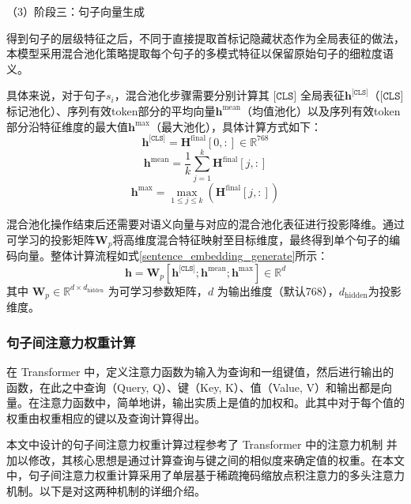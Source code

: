 （3）阶段三：句子向量生成

得到句子的层级特征之后，不同于直接提取首标记隐藏状态作为全局表征的做法，本模型采用混合池化策略提取每个句子的多模式特征以保留原始句子的细粒度语义。

具体来说，对于句子$s_i$，混合池化步骤需要分别计算其 $\texttt{[CLS]}$ 全局表征$\textbf{h}^\texttt{[CLS]}$（$\texttt{[CLS]}$ 标记池化）、序列有效token部分的平均向量$\textbf{h}^\text{mean}$（均值池化）以及序列有效token部分沿特征维度的最大值$\textbf{h}^\text{max}$（最大池化），具体计算方式如下：
\begin{equation}
    \textbf{h}^\texttt{[CLS]} = \textbf{H}^{\text{final}}[0, :] \in \mathbb{R}^{768}
\end{equation}
\begin{equation}
    \textbf{h}^{\text{mean}} = \frac{1}{k} \sum_{j=1}^{k} \textbf{H}^{\text{final}}[j, :]
\end{equation}
\begin{equation}
    \textbf{h}^{\text{max}} = \max_{1 \leq j \leq k} (\textbf{H}^{\text{final}}[j, :])
\end{equation}

混合池化操作结束后还需要对语义向量与对应的混合池化表征进行投影降维。通过可学习的投影矩阵$\textbf{W}_p$将高维度混合特征映射至目标维度，最终得到单个句子的编码向量。整体计算流程如式\ref{sentence_embedding_generate}所示：
\begin{equation}\label{sentence_embedding_generate}
    \textbf{h} = \textbf{W}_p[\textbf{h}^\texttt{[CLS]}; \textbf{h}^{\text{mean}}; \textbf{h}^{\text{max}}] \in \mathbb{R}^d
\end{equation}
其中 $\textbf{W}_p \in \mathbb{R}^{d \times d_\text{hidden}}$ 为可学习参数矩阵，$d$ 为输出维度（默认768），$d_\text{hidden}$为投影维度。

\subsubsection{句子间注意力权重计算}

在 Transformer 中，定义注意力函数为输入为查询和一组键值，然后进行输出的函数，在此之中查询（Query, Q）、键（Key, K）、值（Value, V）和输出都是向量。在注意力函数中，简单地讲，输出实质上是值的加权和。此其中对于每个值的权重由权重相应的键以及查询计算得出。

本文中设计的句子间注意力权重计算过程参考了 Transformer 中的注意力机制 \cite{transformer} 并加以修改，其核心思想是通过计算查询与键之间的相似度来确定值的权重。在本文中，句子间注意力权重计算采用了单层基于稀疏掩码缩放点积注意力的多头注意力机制。以下是对这两种机制的详细介绍。

